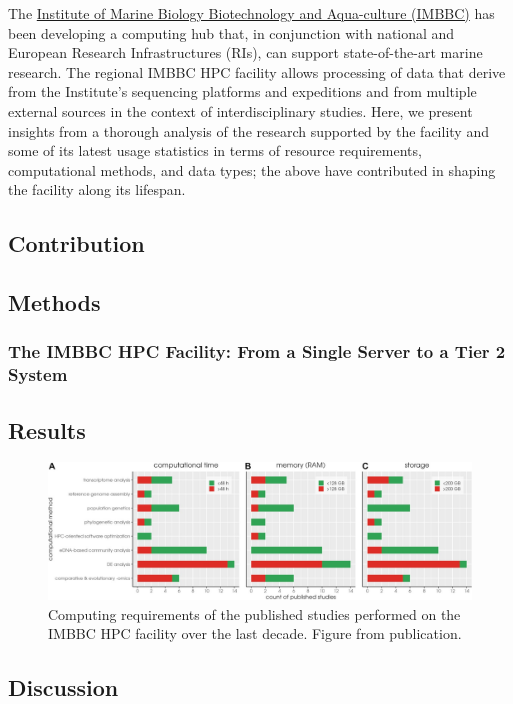    The \href{https://imbbc.hcmr.gr/}{Institute of Marine Biology Biotechnology and Aqua-culture (IMBBC)} 
   has been developing a computing hub that, in conjunction with national and European Research Infrastructures (RIs), 
   can support state-of-the-art marine research. 
   The regional IMBBC HPC facility allows processing of data that derive from the Institute's sequencing platforms 
   and expeditions and from multiple external sources in the context of interdisciplinary studies. 
   Here, we present insights from a thorough analysis of the research supported by the facility and some 
   of its latest usage statistics in terms of resource requirements, computational methods, and data types; 
   the above have contributed in shaping the facility along its lifespan.


   \subsection{Contribution}

   \subsection{Methods}

   \subsubsection*{The IMBBC HPC Facility: From a Single Server to a Tier 2 System}

   





\subsection{Results}



\begin{figure}[h]
   \centering
   \includegraphics[width=140mm]{figures/zorbas_jobs_resources.jpeg}
   \caption{Computing requirements of the published studies performed on the IMBBC HPC facility over the last decade. Figure from publication.
   }
   \label{fig:zorba_jobs}
\end{figure}


\subsection{Discussion}








